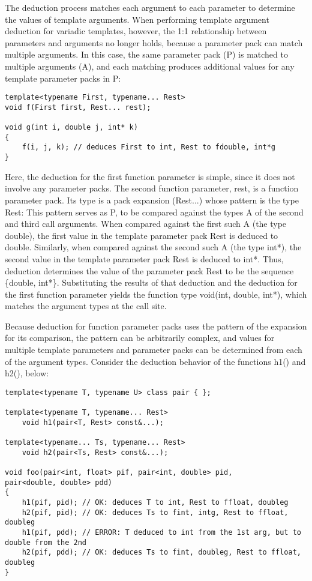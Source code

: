 
The deduction process matches each argument to each parameter to determine the values of template arguments. When performing template argument deduction for variadic templates, however, the 1:1 relationship between parameters and arguments no longer holds, because a parameter pack can match multiple arguments. In this case, the same parameter pack (P) is matched to multiple arguments (A), and each matching produces additional values for any template parameter packs in P:

\begin{lstlisting}[style=styleCXX]
template<typename First, typename... Rest>
void f(First first, Rest... rest);

void g(int i, double j, int* k)
{
	f(i, j, k); // deduces First to int, Rest to fdouble, int*g
}
\end{lstlisting}

Here, the deduction for the first function parameter is simple, since it does not involve any parameter packs. The second function parameter, rest, is a function parameter pack. Its type is a pack expansion (Rest...) whose pattern is the type Rest: This pattern serves as P, to be compared against the types A of the second and third call arguments. When compared against the first such A (the type double), the first value in the template parameter pack Rest is deduced to double. Similarly, when compared against the second such A (the type int*), the second value in the template parameter pack Rest is deduced to int*. Thus, deduction determines the value of the parameter pack Rest to be the sequence \{double, int*\}. Substituting the results of that deduction and the deduction for the first function parameter yields the function type void(int, double, int*), which matches the argument types at the call site.

Because deduction for function parameter packs uses the pattern of the expansion for its comparison, the pattern can be arbitrarily complex, and values for multiple template parameters and parameter packs can be determined from each of the argument types. Consider the deduction behavior of the functions h1() and h2(), below:

\begin{lstlisting}[style=styleCXX]
template<typename T, typename U> class pair { };

template<typename T, typename... Rest>
	void h1(pair<T, Rest> const&...);

template<typename... Ts, typename... Rest>
	void h2(pair<Ts, Rest> const&...);

void foo(pair<int, float> pif, pair<int, double> pid,
pair<double, double> pdd)
{
	h1(pif, pid); // OK: deduces T to int, Rest to ffloat, doubleg
	h2(pif, pid); // OK: deduces Ts to fint, intg, Rest to ffloat, doubleg
	h1(pif, pdd); // ERROR: T deduced to int from the 1st arg, but to double from the 2nd
	h2(pif, pdd); // OK: deduces Ts to fint, doubleg, Rest to ffloat, doubleg
}
\end{lstlisting}

